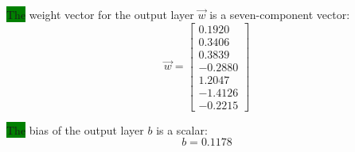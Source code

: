 \documentclass[metals,article,accept,pdftex,moreauthors]{Definitions/mdpi}
\newcommand{\hlok}[1]{\colorbox{green}{#1}}
\begin{document}
\hlok{The} weight vector for the output layer $\overrightarrow{w}$ is a seven-component vector:
\begin{equation*}
\overrightarrow{w} = \left[
\begin{array}{r}
0.1920 \\
0.3406 \\
0.3839 \\
-0.2880 \\
1.2047 \\
-1.4126 \\
-0.2215
\end{array}\right]
\end{equation*}

\hlok{The} bias of the output layer $b$ is a scalar:
\begin{equation*}
b = 0.1178
\end{equation*}
\end{document}
